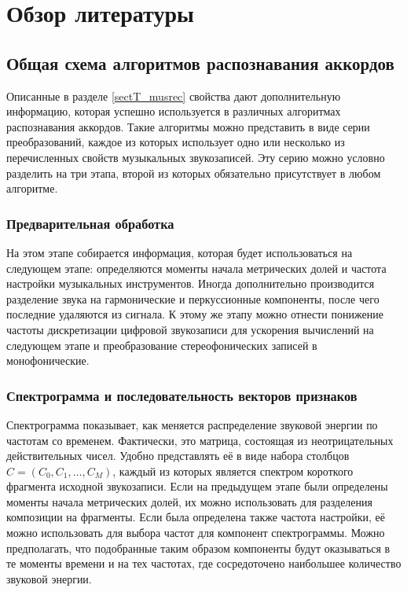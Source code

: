 \section{Обзор литературы} \label{sectT_lit}

\subsection{Общая схема алгоритмов распознавания аккордов} \label{ssectT_scheme}

Описанные в разделе \ref{sectT_musrec} свойства дают дополнительную информацию,
которая успешно используется в различных алгоритмах распознавания аккордов.
Такие алгоритмы можно представить в виде серии преобразований, каждое из которых
использует одно или несколько из перечисленных свойств музыкальных звукозаписей.
Эту серию можно условно разделить на три этапа, второй из которых обязательно
присутствует в любом алгоритме.

\subsubsection{Предварительная обработка} \label{sssectT_prelim}

На этом этапе собирается информация, которая будет использоваться на следующем
этапе: определяются моменты начала метрических долей и частота настройки
музыкальных инструментов. Иногда дополнительно производится разделение звука на
гармонические и перкуссионные компоненты, после чего последние удаляются из
сигнала. К этому же этапу можно отнести понижение частоты дискретизации цифровой
звукозаписи для ускорения вычислений на следующем этапе и преобразование
стереофонических записей в монофонические.

\subsubsection{Спектрограмма и последовательность векторов признаков}
\label{sssectT_feat}

Спектрограмма показывает, как меняется распределение звуковой энергии по
частотам со временем. Фактически, это матрица, состоящая из неотрицательных
действительных чисел. Удобно представлять её в виде набора столбцов $C = (C_0,
C_1, \ldots, C_M)$, каждый из которых является спектром короткого фрагмента
исходной звукозаписи. Если на предыдущем этапе были определены моменты начала
метрических долей, их можно использовать для разделения композиции на фрагменты.
Если была определена также частота настройки, её можно использовать для выбора
частот для компонент спектрограммы. Можно предполагать, что подобранные таким
образом компоненты будут оказываться в те моменты времени и на тех частотах, где
сосредоточено наибольшее количество звуковой энергии.

